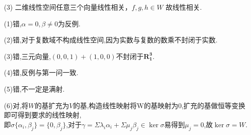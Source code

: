 \documentclass[UTF8]{article}
\begin{document}
(3) 二维线性空间任意三个向量线性相关，$f,g,h \in W$ 故线性相关.
\par
{}
(1)错,$\alpha=0,\beta \neq 0$为反例.\par
(2)错,对于复数域不构成线性空间,因为实数与复数的数乘不封闭于实数.\par
(3)错,三元向量,$(0,0,1)+(1,0,0)$不封闭于$\mathbf{R^3_1}$.\par
(4)错,反例与第一问一致.\par
(5)错,不一定是满射.\par
(6)对,将$W$的基扩充为$V$的基,构造线性映射将W的基映射为0,扩充的基做恒等变换即可得到要求的线性映射,\\
即$\sigma\{\alpha_i,\beta_j\}=\{0,\beta_j\}$,对于$\gamma=\Sigma \lambda_i\alpha_i+\Sigma\mu_j\beta_j\in\ker\sigma$易得到$\mu_j=0$,故$\ker\sigma=W$.
\end{document}
